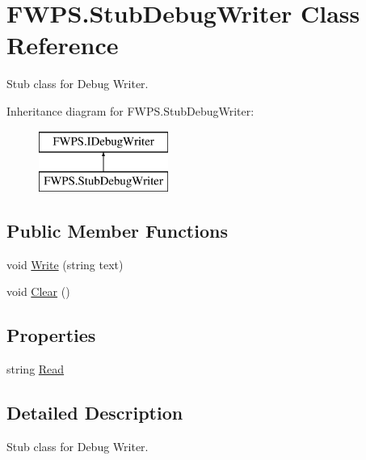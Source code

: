 \hypertarget{class_f_w_p_s_1_1_stub_debug_writer}{}\section{F\+W\+P\+S.\+Stub\+Debug\+Writer Class Reference}
\label{class_f_w_p_s_1_1_stub_debug_writer}


Stub class for Debug Writer.  


Inheritance diagram for F\+W\+P\+S.\+Stub\+Debug\+Writer\+:\begin{figure}[H]
\begin{center}
\leavevmode
\includegraphics[height=2.000000cm]{class_f_w_p_s_1_1_stub_debug_writer}
\end{center}
\end{figure}
\subsection*{Public Member Functions}
\begin{DoxyCompactItemize}
\item 
void \mbox{\hyperlink{class_f_w_p_s_1_1_stub_debug_writer_a7c7382228333a504cce7ae7fc8bdd25f}{Write}} (string text)
\item 
void \mbox{\hyperlink{class_f_w_p_s_1_1_stub_debug_writer_a18682f40a0653f9ec10e49eadb99af57}{Clear}} ()
\end{DoxyCompactItemize}
\subsection*{Properties}
\begin{DoxyCompactItemize}
\item 
string \mbox{\hyperlink{class_f_w_p_s_1_1_stub_debug_writer_a3c5817a6047c76052349f43f1832411f}{Read}}
\end{DoxyCompactItemize}


\subsection{Detailed Description}
Stub class for Debug Writer. 

